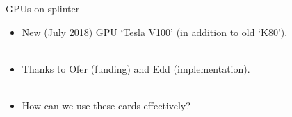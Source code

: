 \documentclass[usenames,dvipsnames]{beamer}
\begin{document}
\begin{frame}{GPUs on splinter}
  \begin{block}{}
    \begin{itemize}
      \item{New (July 2018) GPU `Tesla V100' (in addition to old `K80').}\\~\
      \item{Thanks to Ofer (funding) and Edd (implementation).}\\~\
      \item{How can we use these cards effectively?}
    \end{itemize}
  \end{block}
\end{frame}
\end{document}
